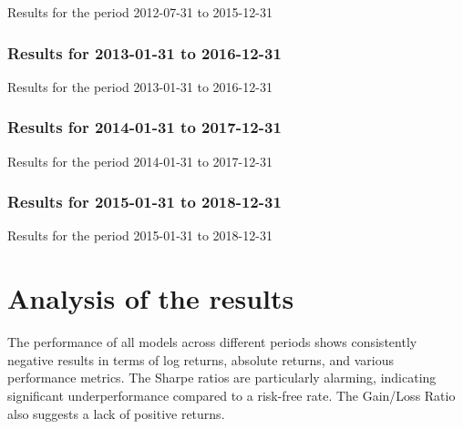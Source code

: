 \documentclass[a4paper,10pt]{article}
\begin{document}
\begin{table}[h]
  \centering
  \caption{Results for the period 2012-07-31 to 2015-12-31}
  \label{tab:results_2012-07-31_2015-12-31}
\end{table}

\subsubsection{Results for 2013-01-31 to 2016-12-31}

\begin{table}[h]
  \centering
  \caption{Results for the period 2013-01-31 to 2016-12-31}
  \label{tab:results_2013-01-31_2016-12-31}
\end{table}

\subsubsection{Results for 2014-01-31 to 2017-12-31}

\begin{table}[h]
  \centering
  \caption{Results for the period 2014-01-31 to 2017-12-31}
  \label{tab:results_2014-01-31_2017-12-31}
\end{table}

\clearpage  %

\subsubsection{Results for 2015-01-31 to 2018-12-31}

\begin{table}[h]
  \centering
  \caption{Results for the period 2015-01-31 to 2018-12-31}
  \label{tab:results_2015-01-31_2018-12-31}
\end{table}

\section{Analysis of the results}

The performance of all models across different periods shows consistently negative results in terms of log returns, absolute returns, and various performance metrics. The Sharpe ratios are particularly alarming, indicating significant underperformance compared to a risk-free rate. The Gain/Loss Ratio also suggests a lack of positive returns.
\end{document}

